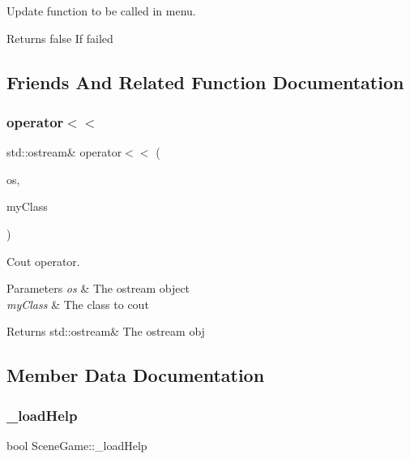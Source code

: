 Update function to be called in menu. 

\begin{DoxyReturn}{Returns}
false If failed 
\end{DoxyReturn}


\subsection{Friends And Related Function Documentation}
\mbox{\label{class_scene_game_abc95c7a5340188a5cf8d86243d2369ae}} 
\subsubsection{\texorpdfstring{operator$<$$<$}{operator<<}}
{\footnotesize\ttfamily std\+::ostream\& operator$<$$<$ (\begin{DoxyParamCaption}\item[{std\+::ostream \&}]{os,  }\item[{const \hyperlink{class_scene_game}{Scene\+Game} \&}]{my\+Class }\end{DoxyParamCaption})\hspace{0.3cm}{\ttfamily [friend]}}



Cout operator. 


\begin{DoxyParams}{Parameters}
{\em os} & The ostream object \\
\hline
{\em my\+Class} & The class to cout \\
\hline
\end{DoxyParams}
\begin{DoxyReturn}{Returns}
std\+::ostream\& The ostream obj 
\end{DoxyReturn}


\subsection{Member Data Documentation}
\mbox{\label{class_scene_game_ace4cb459a6b78ff4fa742972d8769460}} 
\subsubsection{\texorpdfstring{\+\_\+load\+Help}{\_loadHelp}}
{\footnotesize\ttfamily bool Scene\+Game\+::\+\_\+load\+Help\hspace{0.3cm}{\ttfamily [protected]}}

